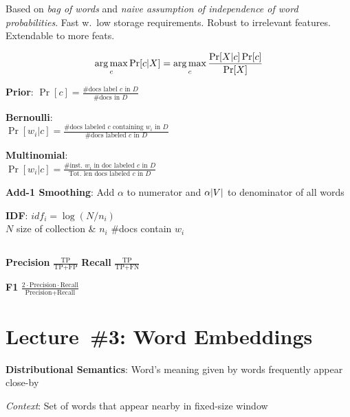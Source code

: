 \documentclass[9pt]{extarticle}
\renewcommand{\green}[1]{{\color{ForestGreen} #1}}
\newcommand{\greenbf}[1]{\textbf{\green{#1}}}
\begin{document}
\begin{multicols}{3}
  Based on \textit{bag of words} and \textit{naive assumption of independence of word probabilities}. Fast w.\ low storage requirements. Robust to irrelevant features. Extendable to more feats.

  \begin{equation*}\label{eq:L02:NaiveBayes}
    \operatorname*{arg\,max}_c \Pr\lbrack c \vert X\rbrack = \operatorname*{arg\,max}_{c} \frac{\Pr[X \vert c] \Pr[c]}{\Pr[X]}
  \end{equation*}

  \greenbf{Prior}: $\Pr[c] = \frac{\text{\#docs label } c \text{ in } D}{\text{\#docs in } D}$

  \greenbf{Bernoulli}: \\ $\Pr[w_ i \vert c] = \frac{\text{\# docs labeled } c \text{ containing } w_i \text{ in } D}{\text{\#docs labeled } c \text{ in } D}$

  \greenbf{Multinomial}: \\ $\Pr[w_i \vert c] = \frac{\text{\# inst.\ } w_i \text{ in doc labeled } c \text{ in } D}{\text{Tot.\ len docs labeled } c \text{ in } D}$

  \greenbf{Add-1 Smoothing}: Add $\alpha$ to numerator and $\alpha\lvert V\rvert$ to denominator of all words

  \greenbf{IDF}: $idf_i = \log \left(N/n_i\right)$ \\ $N$ size of collection \& $n_i$ \#docs contain $w_i$

  \subsection*{}

  \greenbf{Precision} $\frac{\text{TP}}{\text{TP} + \text{FP}}$ \hspace{0.1cm} \greenbf{Recall} $\frac{\text{TP}}{\text{TP} + \text{FN}}$

  \greenbf{F1} $\frac{2 \cdot \text{Precision} \cdot \text{Recall}}{\text{Precision} + \text{Recall}}$

  \section*{Lecture~\#3: Word Embeddings}
  \greenbf{Distributional Semantics}: Word's meaning given by words frequently appear close-by

  \textit{Context}: Set of words that appear nearby in fixed-size window

  \subsection*{}


\end{multicols}
\end{document}
